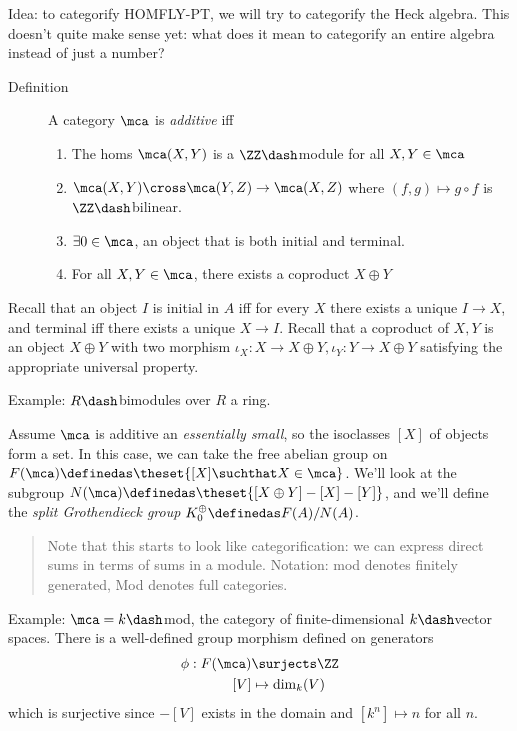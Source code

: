 Idea: to categorify HOMFLY-PT, we will try to categorify the Heck
algebra. This doesn't quite make sense yet: what does it mean to
categorify an entire algebra instead of just a number?

\begin{description}
\item[Definition]
A category \(\mca\) is \emph{additive} iff

\begin{enumerate}
\def\labelenumi{\arabic{enumi}.}
\tightlist
\item
  The homs \(\mca(X, Y)\) is a \(\ZZ\dash\)module for all
  \(X, Y\in \mca\)
\item
  \(\mca(X, Y) \cross \mca(Y, Z) \to \mca(X, Z)\) where
  \((f, g) \mapsto g\circ f\) is \(\ZZ\dash\)bilinear.
\item
  \(\exists 0\in \mca\), an object that is both initial and terminal.
\item
  For all \(X, Y\in \mca\), there exists a coproduct \(X\oplus Y\)
\end{enumerate}
\end{description}

Recall that an object \(I\) is initial in \(A\) iff for every \(X\)
there exists a unique \(I\to X\), and terminal iff there exists a unique
\(X\to I\). Recall that a coproduct of \(X, Y\) is an object
\(X\oplus Y\) with two morphism
\(\iota_X: X\to X\oplus Y, \iota_Y: Y\to X\oplus Y\) satisfying the
appropriate universal property.

Example: \(R\dash\)bimodules over \(R\) a ring.

Assume \(\mca\) is additive an \emph{essentially small}, so the
isoclasses \([X]\) of objects form a set. In this case, we can take the
free abelian group on
\(F(\mca) \definedas \theset{[X] \suchthat X\in \mca}\). We'll look at
the subgroup \(N(\mca) \definedas \theset{[X\oplus Y] - [X] - [Y]}\),
and we'll define the \emph{split Grothendieck group}
\(K_0^\oplus \definedas F(A) / N(A)\).

\begin{quote}
Note that this starts to look like categorification: we can express
direct sums in terms of sums in a module. Notation: mod denotes finitely
generated, Mod denotes full categories.
\end{quote}

Example: \(\mca = k\dash\)mod, the category of finite-dimensional
\(k\dash\)vector spaces. There is a well-defined group morphism defined
on generators \begin{align*}
\phi: F(\mca) &\surjects \ZZ \\
[V] &\mapsto \dim_k(V)
\end{align*} which is surjective since \(-[V]\) exists in the domain and
\([k^n] \mapsto n\) for all \(n\).

